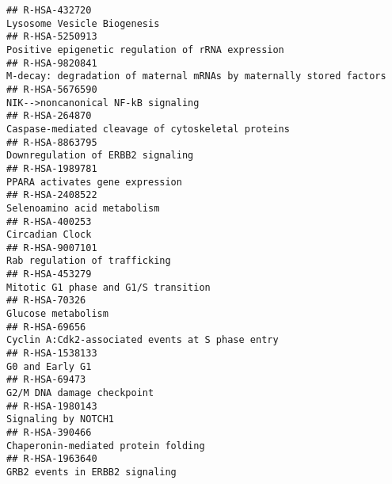 \documentclass[
]{article}
\begin{document}
\begin{verbatim}
## R-HSA-432720                                                                                                           Lysosome Vesicle Biogenesis
## R-HSA-5250913                                                                                    Positive epigenetic regulation of rRNA expression
## R-HSA-9820841                                                                  M-decay: degradation of maternal mRNAs by maternally stored factors
## R-HSA-5676590                                                                                                   NIK-->noncanonical NF-kB signaling
## R-HSA-264870                                                                                    Caspase-mediated cleavage of cytoskeletal proteins
## R-HSA-8863795                                                                                                    Downregulation of ERBB2 signaling
## R-HSA-1989781                                                                                                      PPARA activates gene expression
## R-HSA-2408522                                                                                                          Selenoamino acid metabolism
## R-HSA-400253                                                                                                                       Circadian Clock
## R-HSA-9007101                                                                                                        Rab regulation of trafficking
## R-HSA-453279                                                                                                  Mitotic G1 phase and G1/S transition
## R-HSA-70326                                                                                                                     Glucose metabolism
## R-HSA-69656                                                                                       Cyclin A:Cdk2-associated events at S phase entry
## R-HSA-1538133                                                                                                                      G0 and Early G1
## R-HSA-69473                                                                                                             G2/M DNA damage checkpoint
## R-HSA-1980143                                                                                                                  Signaling by NOTCH1
## R-HSA-390466                                                                                                   Chaperonin-mediated protein folding
## R-HSA-1963640                                                                                                       GRB2 events in ERBB2 signaling

\end{verbatim}
\end{document}
